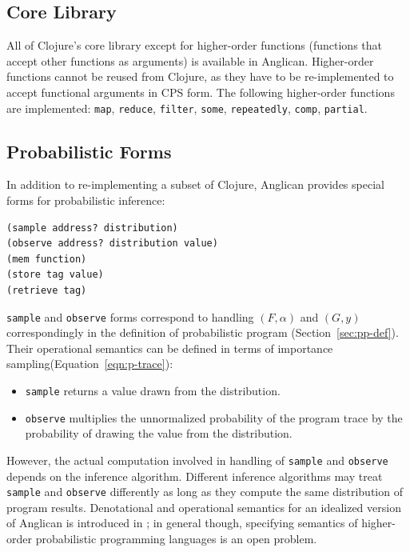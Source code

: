 \documentclass[preprint]{sigplanconf}
\begin{document}
\subsection{Core Library}
\label{sec:core}

All of Clojure's core library except for higher-order functions
(functions that accept other functions as arguments) is
available in Anglican. Higher-order functions cannot be reused
from Clojure, as they have to be re-implemented to accept
functional arguments in CPS form. The following higher-order
functions are implemented: \texttt{map}, \texttt{reduce},
\texttt{filter}, \texttt{some}, \texttt{repeatedly},
\texttt{comp}, \texttt{partial}.

\subsection{Probabilistic Forms}

In addition to re-implementing a subset of Clojure, Anglican
provides special forms for probabilistic inference:
\begin{lstlisting}[style=default]
(sample address? distribution)
(observe address? distribution value)
(mem function)
(store tag value)
(retrieve tag)
\end{lstlisting}

\texttt{sample} and \texttt{observe} forms correspond to
handling $(F, \alpha)$ and $(G, y)$ correspondingly in the
definition of probabilistic program (Section~\ref{sec:pp-def}).
Their operational semantics can be defined in terms of
importance sampling(Equation~\ref{eqn:p-trace}): 
\begin{itemize}
	\item \texttt{sample} returns a value drawn from
		the distribution.
	\item \texttt{observe} multiplies the unnormalized
		probability of the program trace by the probability of
		drawing the value from the distribution.
\end{itemize}
However, the actual computation involved in handling of
\texttt{sample} and \texttt{observe} depends on the inference
algorithm. Different inference algorithms may treat
\texttt{sample} and \texttt{observe} differently as long as they
compute the same distribution of program results.
Denotational and operational semantics for an idealized version
of Anglican is introduced in \cite{SYH+16}; in general though,
specifying semantics of higher-order probabilistic programming
languages is an open problem.
\end{document}
